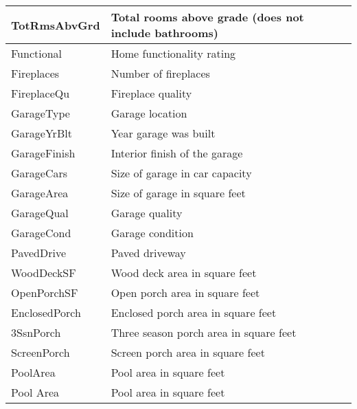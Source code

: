 \begin{table}[H]
\begin{longtable}{|l|l|}
        \hline
        TotRmsAbvGrd  & Total rooms above grade (does not include bathrooms)        \\
        \hline
        Functional    & Home functionality rating                                   \\
        \hline
        Fireplaces    & Number of fireplaces                                        \\
        \hline
        FireplaceQu   & Fireplace quality                                           \\
        \hline
        GarageType    & Garage location                                             \\
        \hline
        GarageYrBlt   & Year garage was built                                       \\
        \hline
        GarageFinish  & Interior finish of the garage                               \\
        \hline
        GarageCars    & Size of garage in car capacity                              \\
        \hline
        GarageArea    & Size of garage in square feet                               \\
        \hline
        GarageQual    & Garage quality                                              \\
        \hline
        GarageCond    & Garage condition                                            \\
        \hline
        PavedDrive    & Paved driveway                                              \\
        \hline
        WoodDeckSF    & Wood deck area in square feet                               \\
        \hline
        OpenPorchSF   & Open porch area in square feet                              \\
        \hline
        EnclosedPorch & Enclosed porch area in square feet                          \\
        \hline
        3SsnPorch     & Three season porch area in square feet                      \\
        \hline
        ScreenPorch   & Screen porch area in square feet                            \\
        \hline
        PoolArea      & Pool area in square feet                                    \\
        \hline
        Pool Area     & Pool area in square feet                                    \\

\end{longtable}
\end{table}
